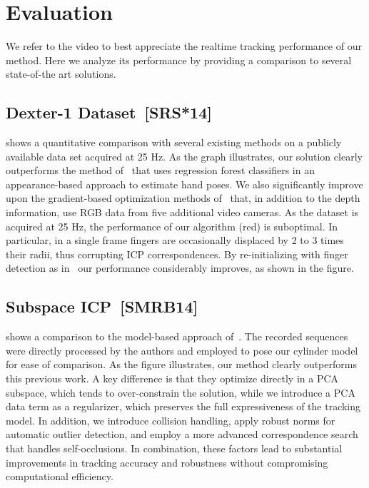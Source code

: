 

\section{Evaluation}
\label{sec:eval}

We refer to the video to best appreciate the realtime tracking performance of our method. Here we analyze its performance by providing a comparison to several state-of-the art solutions.

\subsection*{Dexter-1 Dataset~[SRS*14]}
 shows a quantitative comparison with several existing methods on a publicly available data set acquired at 25 Hz. As the graph illustrates, our solution clearly outperforms the method of~\cite{tang_cvpr14} that uses regression forest classifiers in an appearance-based approach to estimate hand poses. We also significantly improve upon the gradient-based optimization methods of~\cite{sridhar2013multicam,sridhar2014anisotropic} that, in addition to the depth information, use RGB data from five additional video cameras.
% 
As the dataset is acquired at 25 Hz, the performance of our algorithm (red) is suboptimal. In particular, in a single frame fingers are occasionally displaced by 2 to 3 times their radii, thus corrupting ICP correspondences. By re-initializing with finger detection as in~\protect\cite{qian2014realtime} our performance considerably improves, as shown in the figure.


\subsection*{Subspace ICP~[SMRB14]}
 shows a comparison to the model-based approach of~\cite{schroder2014real}. The recorded sequences were directly processed by the authors and employed to pose our cylinder model for ease of comparison.  As the figure illustrates, our method clearly outperforms this previous work.
A key difference is that they optimize directly in a PCA subspace, which tends to over-constrain the solution, while we introduce a PCA data term as a regularizer, which preserves the full expressiveness of the tracking model.
In addition, we introduce collision handling, apply robust norms for automatic outlier detection, and
employ a more advanced correspondence search that handles self-occlusions.
In combination, these factors lead to substantial improvements in tracking accuracy and robustness without compromising computational efficiency.

